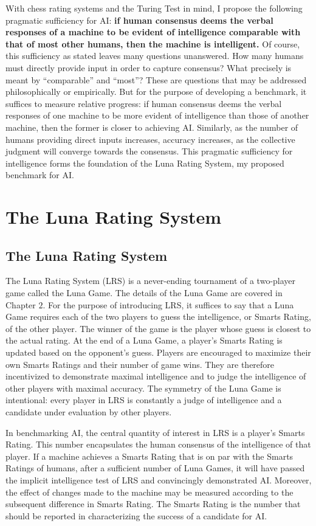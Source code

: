 With chess rating systems and the Turing Test in mind, I propose the following pragmatic sufficiency for AI: \textbf{if human consensus deems the verbal responses of a machine to be evident of intelligence comparable with that of most other humans, then the machine is intelligent.}  Of course, this sufficiency as stated leaves many questions unanswered. How many humans must directly provide input in order to capture consensus? What precisely is meant by ``comparable'' and ``most''? These are questions that may be addressed philosophically or empirically. But for the purpose of developing a benchmark, it suffices to measure relative progress: if human consensus deems the verbal responses of one machine to be more evident of intelligence than those of another machine, then the former is closer to achieving AI. Similarly, as the number of humans providing direct inputs increases, accuracy increases, as the collective judgment will converge towards the consensus. This pragmatic sufficiency for intelligence forms the foundation of the Luna Rating System, my proposed benchmark for AI.

\section{The Luna Rating System}

\subsection{The Luna Rating System}

The Luna Rating System (LRS) is a never-ending tournament of a two-player game called the Luna Game. The details of the Luna Game are covered in Chapter $2$. For the purpose of introducing LRS, it suffices to say that a Luna Game requires each of the two players to guess the intelligence, or Smarts Rating, of the other player. The winner of the game is the player whose guess is closest to the actual rating. At the end of a Luna Game, a player's Smarts Rating is updated based on the opponent's guess. Players are encouraged to maximize their own Smarts Ratings and their number of game wins. They are therefore incentivized to demonstrate maximal intelligence and to judge the intelligence of other players with maximal accuracy. The symmetry of the Luna Game is intentional: every player in LRS is constantly a judge of intelligence and a candidate under evaluation by other players.

In benchmarking AI, the central quantity of interest in LRS is a player's Smarts Rating. This number encapsulates the human consensus of the intelligence of that player. If a machine achieves a Smarts Rating that is on par with the Smarts Ratings of humans, after a sufficient number of Luna Games, it will have passed the implicit intelligence test of LRS and convincingly demonstrated AI. Moreover, the effect of changes made to the machine may be measured according to the subsequent difference in Smarts Rating. The Smarts Rating is the number that should be reported in characterizing the success of a candidate for AI.

